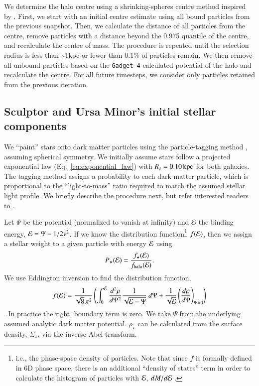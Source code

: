 \documentclass{aa}
\newcommand{\kpc}{{\rm kpc}}
\newcommand{\gadget}{{\tt Gadget-4}}
\begin{document}
We determine the halo centre using a shrinking-spheres centre method inspired by \citet{power+2003}.
First, we start with an initial centre estimate using all bound
particles from the previous snapshot. Then, we calculate the distance of
all particles from the centre, remove particles with a distance beyond
the 0.975 quantile of the centre, and recalculate the centre of mass.
The procedure is repeated until the selection radius is less than
\textasciitilde1kpc or fewer than 0.1\% of particles remain. We then
remove all unbound particles based on the \gadget{} calculated potential
of the halo and recalculate the centre. For all future timesteps, we
consider only particles retained from the previous iteration.

\subsection{Sculptor and Ursa Minor's initial stellar
components}\label{sec:painting_stars}

We ``paint'' stars onto dark matter particles using the particle-tagging
method \citep[e.g.,][]{bullock+johnston2005}, assuming spherical
symmetry. We initially assume stars follow a projected exponential law
(Eq.~\ref{eq:exponential_law}) with \(R_s = 0.10\,\kpc\) for both
galaxies. The tagging method assigns a probability to each dark matter
particle, which is proportional to the ``light-to-mass'' ratio required
to match the assumed stellar light profile. We briefly describe the
procedure next, but refer interested readers to \citet{EP2020}.

Let \(\Psi\) be the potential (normalized to vanish at infinity) and
\({\cal E}\) the binding energy, \({\cal E} = \Psi - 1/2 v^2\). If we
know the distribution function\footnote{i.e., the phase-space density of
  particles. Note that since \(f\) is formally defined in 6D phase
  space, there is an additional ``density of states'' term in order to
  calculate the histogram of particles with \({\cal E}\),
  \(dM/d{\cal E}\) \citep[section 4.4.5,][]{BT1987}.} \(f({\cal E})\),
then we assign a stellar weight to a given particle with energy
\({\cal E}\) using \begin{equation}{
P_\star({\cal E}) = \frac{f_\star({\cal E})}{f_{\rm halo}({\cal E})}.
}\end{equation} We use Eddington inversion to find the distribution
function, 
\begin{equation}{
    f({\cal E}) = \frac{1}{\sqrt{8}\, \pi^2}\left( \int_0^{\cal E} \frac{d^2\rho}{d\Psi^2} \frac{1}{\sqrt{{\cal E} - \Psi}}\ d\Psi + \frac{1}{\sqrt{\cal E}} \left(\frac{d\rho}{d\Psi}\right)_{\Psi=0} \right)
}
\end{equation} 
\citep[eq. 4-140b in][]{BT1987}. In practice the right,
boundary term is zero. We
take \(\Psi\) from the underlying assumed analytic dark matter
potential. \(\rho_\star\) can be calculated from the surface density,
\(\Sigma_\star\), via the inverse Abel transform.
\end{document}
